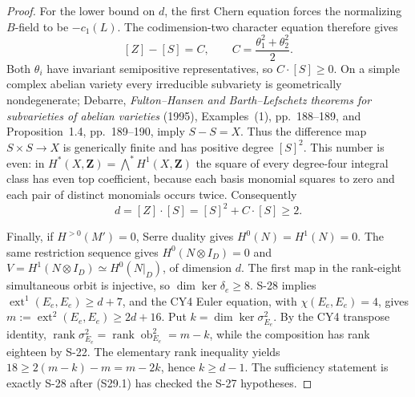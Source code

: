\documentclass[11pt,a4paper]{article}
\theoremstyle{definition}
\begin{document}
\begin{proof}
For the lower bound on $d$, the first Chern equation
forces the normalizing $B$-field to be $-c_1(L)$.
The codimension-two character equation therefore gives
\[
 [Z]-[S]=C,\qquad C=\frac{\theta_1^2+\theta_2^2}{2}.
 \tag{S29.6}
\]
Both $\theta_i$ have invariant semipositive representatives,
so $C\cdot[S]\ge0$. On a simple complex abelian variety
every irreducible subvariety is geometrically nondegenerate;
Debarre, \emph{Fulton--Hansen and Barth--Lefschetz theorems
for subvarieties of abelian varieties} (1995),
Examples~(1), pp.~188--189, and Proposition~1.4,
pp.~189--190, imply $S-S=X$.
Thus the difference map $S\times S\to X$ is generically
finite and has positive degree $[S]^2$.
This number is even: in
$H^*(X,\mathbf Z)=\bigwedge^*H^1(X,\mathbf Z)$ the square
of every degree-four integral class has even top
coefficient, because each basis monomial squares to zero
and each pair of distinct monomials occurs twice.
Consequently
\[
 d=[Z]\cdot[S]=[S]^2+C\cdot[S]\ge2.
 \tag{S29.7}
\]

Finally, if $H^{>0}(M')=0$, Serre duality gives
$H^0(N)=H^1(N)=0$. The same restriction sequence gives
$H^0(N\otimes I_D)=0$ and
$V=H^1(N\otimes I_D)\simeq H^0(N|_D)$, of dimension $d$.
The first map in the rank-eight simultaneous orbit is
injective, so $\dim\ker\delta_e\ge8$.
S-28 implies $\operatorname{ext}^1(E_e,E_e)\ge d+7$,
and the CY4 Euler equation, with $\chi(E_e,E_e)=4$,
gives $m:=\operatorname{ext}^2(E_e,E_e)\ge2d+16$.
Put $k=\dim\ker\sigma^2_{E_e}$.
By the CY4 transpose identity,
$\operatorname{rank}\sigma^2_{E_e}
 =\operatorname{rank}\operatorname{ob}^2_{E_e}=m-k$,
while the composition has rank eighteen by S-22.
The elementary rank inequality yields
$18\ge2(m-k)-m=m-2k$, hence $k\ge d-1$.
The sufficiency statement is exactly S-28 after (S29.1)
has checked the S-27 hypotheses.
\end{proof}
\end{document}
